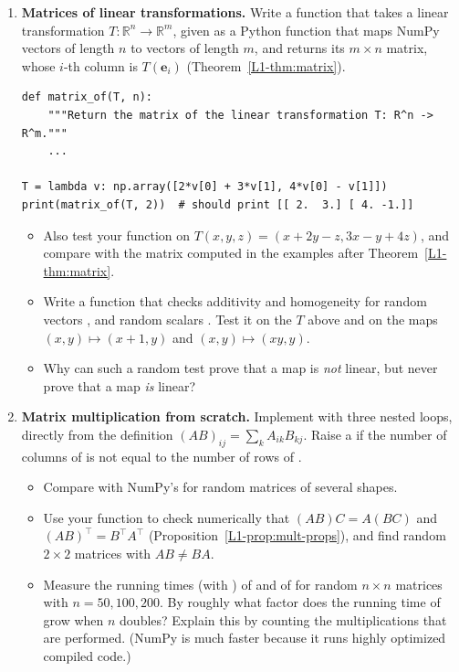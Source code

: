 \begin{enumerate}[label=\textbf{P\arabic*.}, leftmargin=*]
    \item \textbf{Matrices of linear transformations.} Write a function that takes a linear transformation $T: \mathbb{R}^n \to \mathbb{R}^m$, given as a Python function that maps NumPy vectors of length $n$ to vectors of length $m$, and returns its $m \times n$ matrix, whose $i$-th column is $T(\mathbf{e}_i)$ (Theorem~\ref{L1-thm:matrix}).
\begin{lstlisting}
def matrix_of(T, n):
    """Return the matrix of the linear transformation T: R^n -> R^m."""
    ...

T = lambda v: np.array([2*v[0] + 3*v[1], 4*v[0] - v[1]])
print(matrix_of(T, 2))  # should print [[ 2.  3.] [ 4. -1.]]
\end{lstlisting}
    \begin{itemize}
        \item Also test your function on $T(x, y, z) = (x + 2y - z, 3x - y + 4z)$, and compare with the matrix computed in the examples after Theorem~\ref{L1-thm:matrix}.
        \item Write a function  that checks additivity and homogeneity for random vectors ,  and random scalars . Test it on the $T$ above and on the maps $(x, y) \mapsto (x + 1, y)$ and $(x, y) \mapsto (xy, y)$.
        \item Why can such a random test prove that a map is \emph{not} linear, but never prove that a map \emph{is} linear?
    \end{itemize}

    \item \textbf{Matrix multiplication from scratch.} Implement  with three nested loops, directly from the definition $(AB)_{ij} = \sum_k A_{ik} B_{kj}$. Raise a  if the number of columns of  is not equal to the number of rows of .
    \begin{itemize}
        \item Compare  with NumPy's  for random matrices of several shapes.
        \item Use your function to check numerically that $(AB)C = A(BC)$ and $(AB)^\top = B^\top A^\top$ (Proposition~\ref{L1-prop:mult-props}), and find random $2 \times 2$ matrices with $AB \neq BA$.
        \item Measure the running times (with ) of  and of  for random $n \times n$ matrices with $n = 50, 100, 200$. By roughly what factor does the running time of  grow when $n$ doubles? Explain this by counting the multiplications that are performed. (NumPy is much faster because it runs highly optimized compiled code.)
    \end{itemize}


\end{enumerate}
